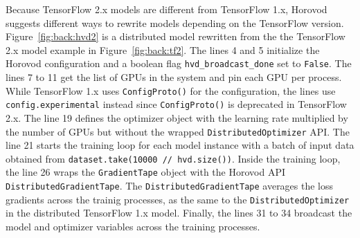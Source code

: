 Because TensorFlow 2.x models are different from TensorFlow 1.x, Horovod
suggests different ways to rewrite models depending on the TensorFlow version.
Figure~\ref{fig:back:hvd2} is a distributed model rewritten from the the
TensorFlow 2.x model example in Figure~\ref{fig:back:tf2}.
The lines 4 and 5 initialize the Horovod configuration and a boolean flag
{\tt hvd\_broadcast\_done} set to {\tt False}.
The lines 7 to 11 get the list of GPUs in the system and pin each GPU per
process. 
While TensorFlow 1.x uses {\tt ConfigProto()} for the configuration, the lines
use {\tt config.experimental} instead since {\tt ConfigProto()} is deprecated
in TensorFlow 2.x.
The line 19 defines the optimizer object with the learning rate multiplied by
the number of GPUs but without the wrapped {\tt DistributedOptimizer} API.
The line 21 starts the training loop for each model instance with a batch of
input data obtained from {\tt dataset.take(10000 // hvd.size())}.
Inside the training loop,
the line 26 wraps the {\tt GradientTape} object with the Horovod API  {\tt
DistributedGradientTape}.
The {\tt DistributedGradientTape} averages the loss gradients across the
trainig processes, as the same to the {\tt DistributedOptimizer} in the
distributed TensorFlow 1.x model.
Finally, the lines 31 to 34 broadcast the model and optimizer variables
across the training processes.
